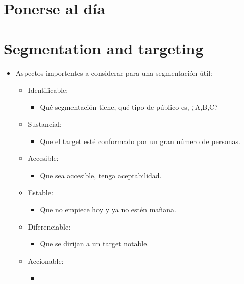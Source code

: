 \section{Ponerse al día }




\section{Segmentation and targeting}
\begin{itemize}
    \item Aspectos importentes a considerar para una segmentación útil:
        \begin{itemize}
            \item Identificable: 
                \begin{itemize}
                    \item Qué segmentación tiene, qué tipo de público es, ¿A,B,C?
                \end{itemize}
                
            \item Sustancial: 
                \begin{itemize}
                    \item Que el target esté conformado por un gran número de personas.
                \end{itemize}
            
            \item Accesible: 
                \begin{itemize}
                    \item Que sea accesible, tenga aceptabilidad.
                \end{itemize}
            
            \item Estable: 
                \begin{itemize}
                    \item Que no empiece hoy y ya no estén mañana.
                \end{itemize}
            
            \item Diferenciable: 
                \begin{itemize}
                    \item Que se dirijan a un target notable.
                \end{itemize}
            
            \item Accionable: 
                \begin{itemize}
                    \item 
                \end{itemize}

        \end{itemize}
\end{itemize}
